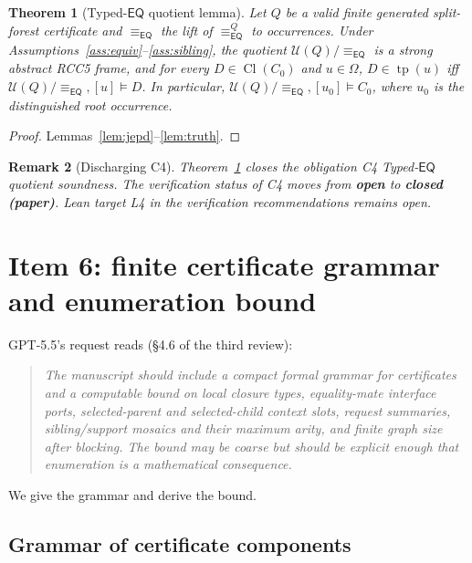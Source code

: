\documentclass[11pt]{article}
\newtheorem{theorem}{Theorem}[section]
\newtheorem{remark}[theorem]{Remark}
\newcommand{\Cl}{\operatorname{Cl}}
\newcommand{\EQ}{\mathsf{EQ}}
\newcommand{\eqrel}{\equiv_{\EQ}}
\newcommand{\eqQ}{\equiv_{\EQ}^{Q}}
\newcommand{\tp}{\operatorname{tp}}
\newcommand{\OPEN}{\textcolor{black!60!orange}{\textbf{open}}}
\newcommand{\CLOSED}{\textcolor{black!70!green}{\textbf{closed (paper)}}}
\begin{document}
\begin{theorem}[Typed-\(\EQ\) quotient lemma]\label{thm:quotient}
Let \(Q\) be a valid finite generated split-forest certificate and
\(\eqrel\) the lift of \(\eqQ\) to occurrences.  Under
Assumptions~\ref{ass:equiv}--\ref{ass:sibling}, the quotient
\(\mathcal U(Q)/\eqrel\) is a strong abstract RCC5 frame, and for
every \(D \in \Cl(C_0)\) and \(u \in \Omega\), \(D \in \tp(u)\) iff
\(\mathcal U(Q)/\eqrel, [u] \models D\).  In particular,
\(\mathcal U(Q)/\eqrel, [u_0] \models C_0\), where \(u_0\) is the
distinguished root occurrence.
\end{theorem}

\begin{proof}
Lemmas~\ref{lem:jepd}--\ref{lem:truth}.
\end{proof}

\begin{remark}[Discharging C4]
Theorem~\ref{thm:quotient} closes the obligation \emph{C4
Typed-\(\EQ\) quotient soundness}.  The verification status of C4
moves from \OPEN{} to \CLOSED{}.  Lean target L4 in the
verification recommendations remains open.
\end{remark}

\section{Item 6: finite certificate grammar and enumeration bound}
\label{sec:grammar}

GPT-5.5's request reads (\S4.6 of the third review):

\begin{quote}\itshape
The manuscript should include a compact formal grammar for
certificates and a computable bound on local closure types,
equality-mate interface ports, selected-parent and selected-child
context slots, request summaries, sibling/support mosaics and their
maximum arity, and finite graph size after blocking.  The bound may
be coarse but should be explicit enough that enumeration is a
mathematical consequence.
\end{quote}

We give the grammar and derive the bound.

\subsection{Grammar of certificate components}
\end{document}
